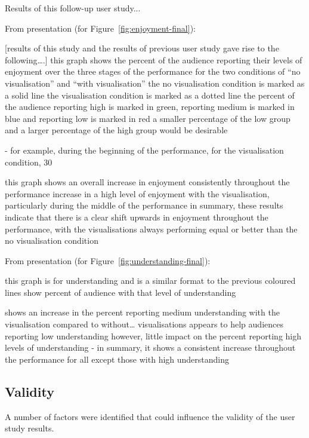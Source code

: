 Results of this follow-up user study...

From presentation (for Figure~\ref{fig:enjoyment-final}):

[results of this study and the results of previous user study gave rise to the following….]
this graph shows the percent of the audience reporting their levels of enjoyment over the three stages of the performance for the two conditions of “no visualisation” and “with visualisation” 
the no visualisation condition is marked as a solid line
the visualisation condition is marked as a dotted line
the percent of the audience reporting high is marked in green, reporting medium is marked in blue and reporting low is marked in red
a smaller percentage of the low group and a larger percentage of the high group would be desirable

- for example, during the beginning of the performance, for the visualisation condition, 30%

this graph shows an overall increase in enjoyment consistently throughout the performance
increase in a high level of enjoyment with the visualisation, particularly during the middle of the performance
in summary, these results indicate that there is a clear shift upwards in enjoyment throughout the performance, with the visualisations always performing equal or better than the no visualisation condition

From presentation (for Figure~\ref{fig:understanding-final}):

this graph is for understanding and is a similar format to the previous
coloured lines show percent of audience with that level of understanding

shows an increase in the percent reporting medium understanding with the visualisation compared to without… 
visualisations appears to help audiences reporting low understanding
however, little impact on the percent reporting high levels of understanding
-  in summary, it shows a consistent increase throughout the performance for all except those with high understanding



\subsection{Validity}

A number of factors were identified that could influence the validity of the user study results.

